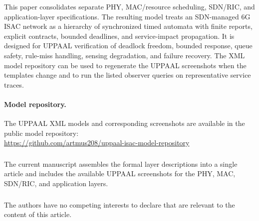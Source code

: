 \documentclass[runningheads]{llncs}
\begin{document}
This paper consolidates separate PHY, MAC/resource scheduling, SDN/RIC, and application-layer specifications. The resulting model treats an SDN-managed 6G ISAC network as a hierarchy of synchronized timed automata with finite reports, explicit contracts, bounded deadlines, and service-impact propagation. It is designed for UPPAAL verification of deadlock freedom, bounded response, queue safety, rule-miss handling, sensing degradation, and failure recovery. The XML model repository can be used to regenerate the UPPAAL screenshots when the templates change and to run the listed observer queries on representative service traces.

\paragraph{Model repository.} The UPPAAL XML models and corresponding screenshots are available in the public model repository:\\[-0.5mm]
{\small\url{https://github.com/artmus208/uppaal-isac-model-repository}}

\begin{credits}
\subsubsection{\ackname} The current manuscript assembles the formal layer descriptions into a single article and includes the available UPPAAL screenshots for the PHY, MAC, SDN/RIC, and application layers.

\subsubsection{\discintname} The authors have no competing interests to declare that are relevant to the content of this article.
\end{credits}



\end{document}
